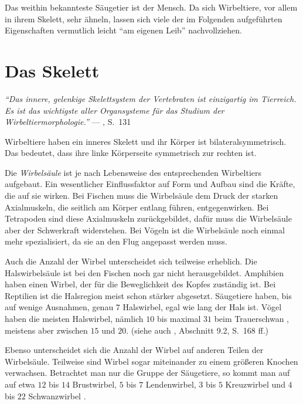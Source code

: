 Das weithin bekannteste Säugetier ist der Mensch. Da sich Wirbeltiere, vor allem in ihrem Skelett, sehr ähneln, lassen sich viele der im Folgenden aufgeführten Eigenschaften vermutlich leicht "`am eigenen Leib"' nachvollziehen.


\section{Das Skelett}
\label{biology_skeleton}

\vspace{0.5cm}
\begin{center}
 \begin{minipage}{12cm}
  \emph{"`Das innere, gelenkige Skelettsystem der Vertebraten ist einzigartig im Tierreich. Es ist das wichtigste aller Organsysteme für das Studium der Wirbeltiermorphologie."'}
  --- \cite{Vergleichende_Anatomie}, S.\ 131
 \end{minipage}
\end{center}

Wirbeltiere haben ein inneres Skelett und ihr Körper ist bilateralsymmetrisch. Das bedeutet, dass ihre linke Körperseite symmetrisch zur rechten ist. 

Die \emph{Wirbelsäule} ist je nach Lebensweise des entsprechenden Wirbeltiers aufgebaut. Ein wesentlicher Einflussfaktor auf Form und Aufbau sind die Kräfte, die auf sie wirken. 
Bei Fischen muss die Wirbelsäule dem Druck der starken Axialmuskeln, die seitlich am Körper entlang führen, entgegenwirken.
Bei Tetrapoden sind diese Axialmuskeln zurückgebildet, dafür muss die Wirbelsäule aber der Schwerkraft widerstehen.
Bei Vögeln ist die Wirbelsäule noch einmal mehr spezialisiert, da sie an den Flug angepasst werden muss.

Auch die Anzahl der Wirbel unterscheidet sich teilweise erheblich. 
Die Halswirbelsäule ist \zb bei den Fischen noch gar nicht herausgebildet. Amphibien haben einen Wirbel, der für die Beweglichkeit des Kopfes zuständig ist. Bei Reptilien ist die Halsregion meist schon stärker abgesetzt. Säugetiere haben, bis auf wenige Ausnahmen, genau $7$ Halswirbel, egal wie lang der Hals ist. Vögel haben die meisten Halswirbel, nämlich $10$ bis maximal $31$ beim Trauerschwan \cite{WikipediaVogelskelett}, meistens aber zwischen $15$ und $20$. (siehe auch \cite{Vergleichende_Anatomie}, Abschnitt 9.2, S.\ 168 ff.)

Ebenso unterscheidet sich die Anzahl der Wirbel auf anderen Teilen der Wirbelsäule. Teilweise sind Wirbel sogar miteinander zu einem größeren Knochen verwachsen. Betrachtet man nur die Gruppe der Säugetiere, so kommt man auf auf etwa $12$ bis $14$ Brustwirbel, $5$ bis $7$ Lendenwirbel, $3$ bis $5$ Kreuzwirbel und $4$ bis $22$ Schwanzwirbel \cite{AnatomieKuenstler}.

